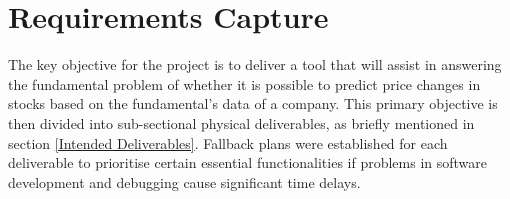 \documentclass[10pt,onecolumn,letterpaper]{article}
\begin{document}
\newpage

\section{Requirements Capture} 

The key objective for the project is to deliver a tool that will assist in answering the fundamental problem of whether it is possible to predict price changes in stocks based on the fundamental's data of a company. This primary objective is then divided into sub-sectional physical deliverables, as briefly mentioned in section \ref{Intended Deliverables}. Fallback plans were established for each deliverable to prioritise certain essential functionalities if problems in software development and debugging cause significant time delays. 
\end{document}
